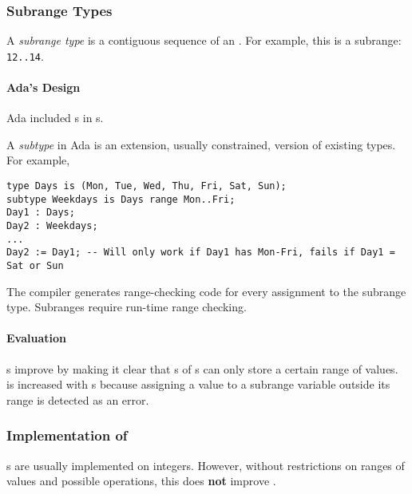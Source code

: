\subsubsection{Subrange Types}\label{subsubsec:Subrange_Types}
\begin{definition}\label{def:Subrange_Type}
  A \emph{subrange type} is a contiguous sequence of an .
  For example, this is a subrange: \texttt{12..14}.
\end{definition}

\paragraph{Ada's Design}\label{par:Adas_Subrange_Types_Design}
Ada included s in s.

\begin{definition}[Subtype]\label{def:Ada_Subtype}
  A \emph{subtype} in Ada is an extension, usually constrained, version of existing types.
  For example,
\begin{verbatim}
type Days is (Mon, Tue, Wed, Thu, Fri, Sat, Sun);
subtype Weekdays is Days range Mon..Fri;
Day1 : Days;
Day2 : Weekdays;
...
Day2 := Day1; -- Will only work if Day1 has Mon-Fri, fails if Day1 = Sat or Sun
\end{verbatim}
\end{definition}

The compiler generates range-checking code for every assignment to the subrange type.
Subranges require run-time range checking.

\paragraph{Evaluation}\label{par:Subrange_Types_Evaluation}
s improve  by making it clear that s of s can only store a certain range of values.
 is increased with s because assigning a value to a subrange variable outside its range is detected as an error.

\subsubsection{Implementation of }\label{subsubsec:Implementation_User_Defined_Ordinal_Types}
s are usually implemented on integers.
However, without restrictions on ranges of values and possible operations, this does \textbf{not} improve .

